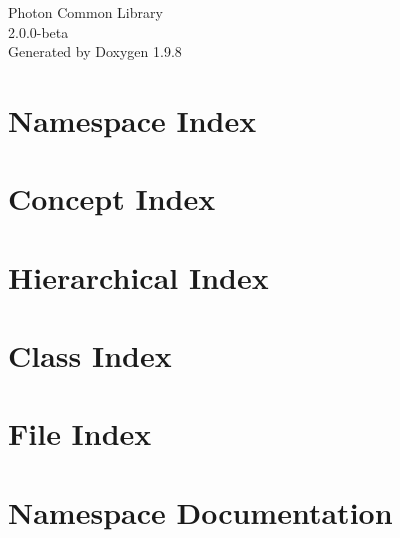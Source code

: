 \documentclass[twoside]{book}
\newcommand{\+}{\discretionary{\mbox{\scriptsize$\hookleftarrow$}}{}{}}
\newcommand{\clearemptydoublepage}{%
    \newpage{\pagestyle{empty}\cleardoublepage}%
  }
\begin{document}
  \raggedbottom
    \hypersetup{pageanchor=false,
                bookmarksnumbered=true,
                pdfencoding=unicode
               }
  \begin{titlepage}
  \vspace*{7cm}
  \begin{center}%
  {\Large Photon Common Library}\\
  [1ex]\large 2.\+0.\+0-\/beta \\
  \vspace*{1cm}
  {\large Generated by Doxygen 1.9.8}\\
  \end{center}
  \end{titlepage}
  \clearemptydoublepage
  \tableofcontents
  \clearemptydoublepage
  \hypersetup{pageanchor=true}

\chapter{Namespace Index}

\chapter{Concept Index}

\chapter{Hierarchical Index}

\chapter{Class Index}

\chapter{File Index}

\chapter{Namespace Documentation}










\end{document}
